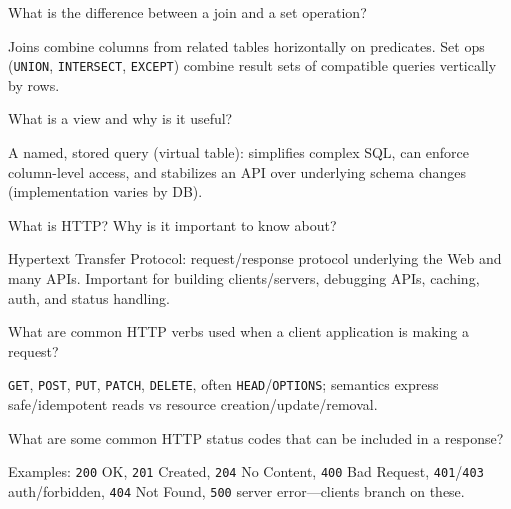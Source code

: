 \question[4]
What is the difference between a join and a set operation?
\makeemptybox{1.25in}
\begin{solution}
  Joins combine columns from related tables horizontally on predicates. Set ops (\texttt{UNION}, \texttt{INTERSECT}, \texttt{EXCEPT}) combine result sets of compatible queries vertically by rows.
\end{solution}

\question[4]
What is a view and why is it useful?
\makeemptybox{1.25in}
\begin{solution}
  A named, stored query (virtual table): simplifies complex SQL, can enforce column-level access, and stabilizes an API over underlying schema changes (implementation varies by DB).
\end{solution}

\newpage


\question[4]
What is HTTP? Why is it important to know about?
\makeemptybox{1.25in}
\begin{solution}
  Hypertext Transfer Protocol: request/response protocol underlying the Web and many APIs. Important for building clients/servers, debugging APIs, caching, auth, and status handling.
\end{solution}

\question[4]
What are common HTTP verbs used when a client application is making a request?
\makeemptybox{1.15in}
\begin{solution}
  \texttt{GET}, \texttt{POST}, \texttt{PUT}, \texttt{PATCH}, \texttt{DELETE}, often \texttt{HEAD}/\texttt{OPTIONS}; semantics express safe/idempotent reads vs resource creation/update/removal.
\end{solution}

\question[4]
What are some common HTTP status codes that can be included in a response?
\makeemptybox{1.35in}
\begin{solution}
  Examples: \texttt{200} OK, \texttt{201} Created, \texttt{204} No Content, \texttt{400} Bad Request, \texttt{401}/\texttt{403} auth/forbidden, \texttt{404} Not Found, \texttt{500} server error---clients branch on these.
\end{solution}

\newpage



